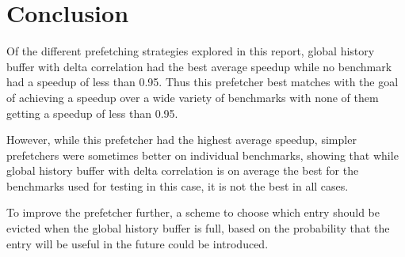 \section{Conclusion}
\label{sec:conclusion}

Of the different prefetching strategies explored in this report,
global history buffer with delta correlation had the best average
speedup while no benchmark had a speedup of less than 0.95. Thus
this prefetcher best matches with the goal of achieving a speedup
over a wide variety of benchmarks with none of them getting a
speedup of less than 0.95.

However, while this prefetcher had the highest average
speedup, simpler prefetchers were sometimes better on
individual benchmarks, showing that while global history buffer
with delta correlation is on average the best for the benchmarks
used for testing in this case, it is not the best in all cases.

To improve the prefetcher further, a scheme to choose which
entry should be evicted when the global history buffer is full,
based on the probability that the entry will be useful in the
future could be introduced.
